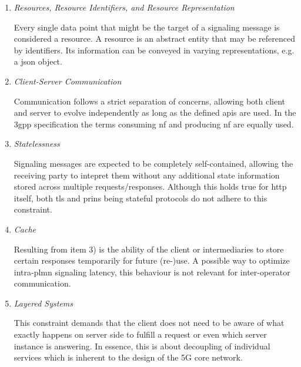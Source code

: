 \begin{enumerate}[label=\arabic*)]
    \item \textit{Resources, Resource Identifiers, and Resource Representation}

    Every single data point that might be the target of a signaling message is considered a resource.
    A resource is an abstract entity that may be referenced by identifiers.
    Its information can be conveyed in varying representations, e.g. a \gls{json} object.

    \item \textit{Client-Server Communication}

    Communication follows a strict separation of concerns, allowing both client and server to evolve independently as long as the defined \glspl{api} are used.
    In the \gls{3gpp} specification the terms consuming \gls{nf} and producing \gls{nf} are equally used.

    \item \textit{Statelessness}

    Signaling messages are expected to be completely self-contained, allowing the receiving party to intepret them without any additional state information stored across multiple requests/responses.
    Although this holds true for \gls{http} itself, both \gls{tls} and \gls{prins} being stateful protocols do not adhere to this constraint.

    \item \textit{Cache}

    Resulting from item 3) is the ability of the client or intermediaries to store certain responses temporarily for future (re-)use.
    A possible way to optimize intra-\gls{plmn} signaling latency, this behaviour is not relevant for inter-operator communication.

    \item \textit{Layered Systems}

    This constraint demands that the client does not need to be aware of what exactly happens on server side to fulfill a request or even which server instance is answering.
    In essence, this is about decoupling of individual services which is inherent to the design of the 5G core network.

\end{enumerate}

